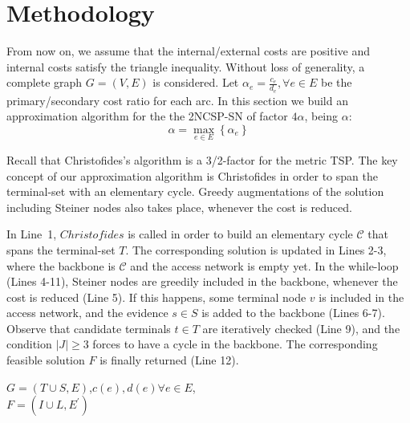 \documentclass{endm}
\begin{document}
\section{Methodology}\label{AA}
From now on, we assume that the internal/external costs are positive and internal costs satisfy the triangle inequality. Without loss of generality, a complete graph $G=(V,E)$ is considered. Let $\alpha_{e}=\frac{c_e}{d_e}, \forall e \in E$ be the primary/secondary cost ratio for each arc.
In this section we build an approximation algorithm for the the 2NCSP-SN of factor $4\alpha$,
being $\alpha$:
\begin{equation}
\alpha = \max_{e\in E} \left\{\alpha_{e} \right\}
\end{equation}

Recall that Christofides's algorithm is a 3/2-factor for the metric TSP.
The key concept of our approximation algorithm is Christofides in order to span the terminal-set
with an elementary cycle. Greedy augmentations of the solution including Steiner nodes also takes place, whenever the cost is reduced.

In Line~1, $Christofides$ is called in order to build an elementary cycle $\mathcal{C}$
that spans the terminal-set $T$. The corresponding solution is updated in Lines 2-3,
where the backbone is $\mathcal{C}$ and the access network is empty yet.
In the while-loop (Lines 4-11),
Steiner nodes are greedily included in the backbone, whenever the cost is reduced (Line 5).
If this happens, some terminal node $v$ is included in the access network, and the
evidence $s \in S$ is added to the backbone (Lines 6-7). Observe that candidate terminals
$t \in T$ are iteratively checked (Line 9), and the condition $|J|\geq 3$ forces to have
a cycle in the backbone. The corresponding feasible solution $F$ is finally returned (Line 12).

\begin{algorithm}[H]
\small
\centering
\begin{algorithmic}[1]
\Require $G=(T\cup S,E)$,$c(e),d(e) \forall e \in E$,
         \Else
    \EndIf
\EndWhile \\
\Return $F=(I\cup L,E^{\prime})$
\end{algorithmic}
\end{algorithm}
\end{document}
